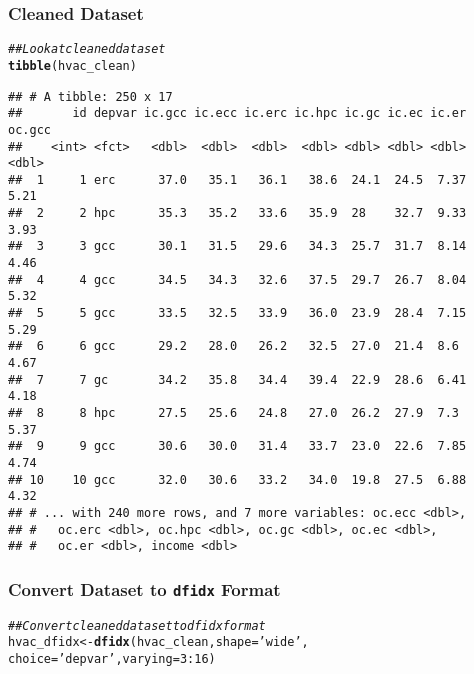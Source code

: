 \documentclass{beamer}\usepackage[]{graphicx}\usepackage[]{color}
\makeatletter
\newcommand{\hlnum}[1]{\textcolor[rgb]{0.686,0.059,0.569}{#1}}%
\newcommand{\hlstr}[1]{\textcolor[rgb]{0.192,0.494,0.8}{#1}}%
\newcommand{\hlcom}[1]{\textcolor[rgb]{0.678,0.584,0.686}{\textit{#1}}}%
\newcommand{\hlopt}[1]{\textcolor[rgb]{0,0,0}{#1}}%
\newcommand{\hlstd}[1]{\textcolor[rgb]{0.345,0.345,0.345}{#1}}%
\newcommand{\hlkwb}[1]{\textcolor[rgb]{0.69,0.353,0.396}{#1}}%
\newcommand{\hlkwc}[1]{\textcolor[rgb]{0.333,0.667,0.333}{#1}}%
\newcommand{\hlkwd}[1]{\textcolor[rgb]{0.737,0.353,0.396}{\textbf{#1}}}%
\newenvironment{kframe}{%
 \def\at@end@of@kframe{}%
 \ifinner\ifhmode%
  \def\at@end@of@kframe{\end{minipage}}%
  \begin{minipage}{\columnwidth}%
 \fi\fi%
 \def\FrameCommand##1{\hskip\@totalleftmargin \hskip-\fboxsep
 \colorbox{shadecolor}{##1}\hskip-\fboxsep
     \hskip-\linewidth \hskip-\@totalleftmargin \hskip\columnwidth}%
 \MakeFramed {\advance\hsize-\width
   \@totalleftmargin\z@ \linewidth\hsize
   \@setminipage}}%
 {\par\unskip\endMakeFramed%
 \at@end@of@kframe}
\newenvironment{knitrout}{}{} %
\makeatother
\begin{document}
\begin{frame}[fragile]\frametitle{Cleaned Dataset}
\begin{knitrout}\footnotesize
{}\color{fgcolor}\begin{kframe}
\begin{alltt}
\hlcom{## Look at cleaned dataset}
\hlkwd{tibble}\hlstd{(hvac_clean)}
\end{alltt}
\begin{verbatim}
## # A tibble: 250 x 17
##       id depvar ic.gcc ic.ecc ic.erc ic.hpc ic.gc ic.ec ic.er oc.gcc
##    <int> <fct>   <dbl>  <dbl>  <dbl>  <dbl> <dbl> <dbl> <dbl>  <dbl>
##  1     1 erc      37.0   35.1   36.1   38.6  24.1  24.5  7.37   5.21
##  2     2 hpc      35.3   35.2   33.6   35.9  28    32.7  9.33   3.93
##  3     3 gcc      30.1   31.5   29.6   34.3  25.7  31.7  8.14   4.46
##  4     4 gcc      34.5   34.3   32.6   37.5  29.7  26.7  8.04   5.32
##  5     5 gcc      33.5   32.5   33.9   36.0  23.9  28.4  7.15   5.29
##  6     6 gcc      29.2   28.0   26.2   32.5  27.0  21.4  8.6    4.67
##  7     7 gc       34.2   35.8   34.4   39.4  22.9  28.6  6.41   4.18
##  8     8 hpc      27.5   25.6   24.8   27.0  26.2  27.9  7.3    5.37
##  9     9 gcc      30.6   30.0   31.4   33.7  23.0  22.6  7.85   4.74
## 10    10 gcc      32.0   30.6   33.2   34.0  19.8  27.5  6.88   4.32
## # ... with 240 more rows, and 7 more variables: oc.ecc <dbl>,
## #   oc.erc <dbl>, oc.hpc <dbl>, oc.gc <dbl>, oc.ec <dbl>,
## #   oc.er <dbl>, income <dbl>
\end{verbatim}
\end{kframe}
\end{knitrout}
\end{frame}

\begin{frame}[fragile]\frametitle{Convert Dataset to \texttt{dfidx} Format}
\begin{knitrout}\footnotesize
{}\color{fgcolor}\begin{kframe}
\begin{alltt}
\hlcom{## Convert cleaned dataset to dfidx format}
\hlstd{hvac_dfidx} \hlkwb{<-} \hlkwd{dfidx}\hlstd{(hvac_clean,} \hlkwc{shape} \hlstd{=} \hlstr{'wide'}\hlstd{,}
                    \hlkwc{choice} \hlstd{=} \hlstr{'depvar'}\hlstd{,} \hlkwc{varying} \hlstd{=} \hlnum{3}\hlopt{:}\hlnum{16}\hlstd{)}
\end{alltt}
\end{kframe}
\end{knitrout}
\end{frame}
\end{document}
